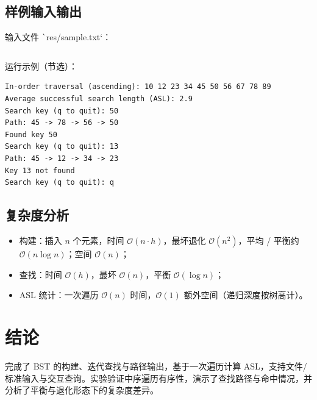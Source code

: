 \documentclass[12pt, a4paper]{ctexart}
\begin{document}
\subsection{样例输入输出}

输入文件 \texttt`res/sample.txt`：

\inputminted{text}{../res/sample.txt}

运行示例（节选）：

\begin{verbatim}
In-order traversal (ascending): 10 12 23 34 45 50 56 67 78 89
Average successful search length (ASL): 2.9
Search key (q to quit): 50
Path: 45 -> 78 -> 56 -> 50
Found key 50
Search key (q to quit): 13
Path: 45 -> 12 -> 34 -> 23
Key 13 not found
Search key (q to quit): q
\end{verbatim}

\subsection{复杂度分析}

\begin{itemize}
    \item 构建：插入 $n$ 个元素，时间 $\mathcal{O}\left(n\cdot h\right)$，最坏退化 $\mathcal{O}\left(n^2\right)$，平均 / 平衡约 $\mathcal{O}\left(n\log n\right)$；空间 $\mathcal{O}\left(n\right)$；
    \item 查找：时间 $\mathcal{O}\left(h\right)$，最坏 $\mathcal{O}\left(n\right)$，平衡 $\mathcal{O}\left(\log n\right)$；
    \item ASL 统计：一次遍历 $\mathcal{O}\left(n\right)$ 时间，$\mathcal{O}\left(1\right)$ 额外空间（递归深度按树高计）。
\end{itemize}

\section{结论}

完成了 BST 的构建、迭代查找与路径输出，基于一次遍历计算 ASL，支持文件/标准输入与交互查询。实验验证中序遍历有序性，演示了查找路径与命中情况，并分析了平衡与退化形态下的复杂度差异。
\end{document}
